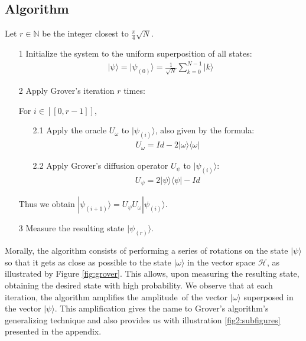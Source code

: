 \subsection{Algorithm}
Let $r\in \mathbb{N}$ be the integer closest to $\frac{\pi}{4} \sqrt{N}$.
\begin{itemize}
	\item[1] Initialize the system to the uniform superposition of all states:
	\begin{align}
	|\psi \rangle = |\psi_{(0)}\rangle = \frac{1}{\sqrt{N}} \sum_{k=0}^{N-1} |k\rangle
    \label{init}
	\end{align}
	\item[2] Apply Grover's iteration $r$ times:
	\item[] For $i \in [\![0, r-1]\!]$,
	\begin{itemize}
   	 
    	\item[2.1] Apply the oracle $U_{\omega}$ to $|\psi_{(i)}\rangle$, also given by the formula:
    	\begin{align}
    	U_{\omega} = Id -  2|\omega \rangle \langle \omega |
    	\label{Uomega}
    	\end{align}
    	\item[2.2] Apply Grover's diffusion operator $U_{\psi}$ to $|\psi_{(i)}\rangle$:
    	\begin{align}
    	U_{\psi} = 2|\psi\rangle \langle \psi | - Id
        \label{Upsi}
    	\end{align}
	\end{itemize}
	\item[] Thus we obtain $|\psi_{(i+1)}\rangle = U_{\psi}U_{\omega} |\psi_{(i)} \rangle$. 
	\item[3] Measure the resulting state $|\psi_{(r)} \rangle$.
\end{itemize}

\noindent Morally, the algorithm consists of performing a series of rotations on the state $|\psi \rangle$ so that it gets as close as possible to the state $|\omega \rangle$ in the vector space $\mathcal{H}$, as illustrated by Figure \ref{fig:grover}. 
This allows, upon measuring the resulting state, obtaining the desired state with high probability. 
We observe that at each iteration, the algorithm amplifies the amplitude\footnotemark \, of the vector $|\omega\rangle$ superposed in the vector $|\psi\rangle$. This amplification gives the name to Grover's algorithm's generalizing technique and also provides us with illustration \ref{fig2:subfigures} presented in the appendix.

